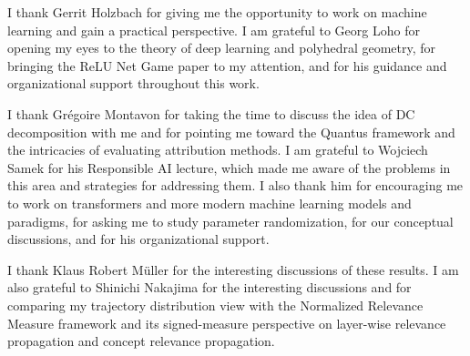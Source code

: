 I thank Gerrit Holzbach for giving me the opportunity to work on machine learning
and gain a practical perspective. I am grateful to Georg Loho for opening my eyes to the theory of deep learning
and polyhedral geometry, for bringing the ReLU Net Game paper to my attention,
and for his guidance and organizational support throughout this work.

I thank Grégoire Montavon for taking the time to discuss the idea of DC
decomposition with me and for pointing me toward the Quantus framework and the
intricacies of evaluating attribution methods. I am grateful to Wojciech Samek
for his Responsible AI lecture, which made me aware of the problems in this area
and strategies for addressing them. I also thank him for encouraging me to work
on transformers and more modern machine learning models and paradigms, for asking
me to study parameter randomization, for our conceptual discussions, and for his
organizational support.

I thank Klaus Robert Müller for the interesting discussions of these results.
I am also grateful to Shinichi Nakajima for the interesting discussions and for
comparing my trajectory distribution view with the Normalized Relevance Measure
framework and its signed-measure perspective on layer-wise relevance propagation
and concept relevance propagation.
